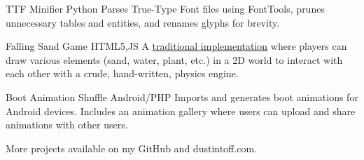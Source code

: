  {TTF Minifier} {Python} {
    Parses True-Type Font files using  {FontTools}, prunes unnecessary tables and entities, and renames glyphs for brevity.
}

 {Falling Sand Game} {HTML5,JS} {
    A \href {https://en.wikipedia.org/wiki/Falling-sand_game} {traditional implementation} where players can draw various elements (sand, water, plant, etc.) in a 2D world to interact with each other with a crude, hand-written, physics engine.
}

\personalProject {} {Boot Animation Shuffle} {Android/PHP} {
    Imports and generates boot animations for Android devices. Includes an animation gallery where users can upload and share animations with other users.
}

More projects available on { {my GitHub}} and { {dustintoff.com}}.